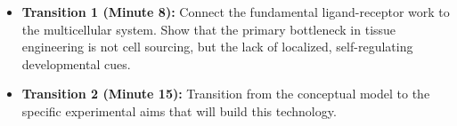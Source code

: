 \begin{itemize}
    \item \textbf{Transition 1 (Minute 8):} Connect the fundamental ligand-receptor work to the multicellular system. Show that the primary bottleneck in tissue engineering is not cell sourcing, but the lack of localized, self-regulating developmental cues.
    \item \textbf{Transition 2 (Minute 15):} Transition from the conceptual model to the specific experimental aims that will build this technology.
\end{itemize}
